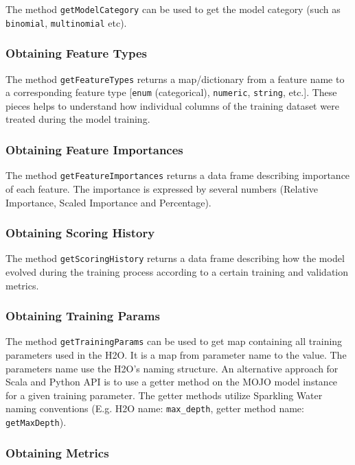 The method \texttt{getModelCategory} can be used to get the model category (such as \texttt{binomial}, \texttt{multinomial} etc).

\subsubsection{Obtaining Feature Types}

The method \texttt{getFeatureTypes} returns a map/dictionary from a feature name to a corresponding feature type
[\texttt{enum} (categorical), \texttt{numeric}, \texttt{string}, etc.]. These pieces helps to understand how individual
columns of the training dataset were treated during the model training.

\subsubsection{Obtaining Feature Importances}

The method \texttt{getFeatureImportances} returns a data frame describing importance of each feature. The importance is expressed
by several numbers (Relative Importance, Scaled Importance and Percentage).

\subsubsection{Obtaining Scoring History}

The method \texttt{getScoringHistory} returns a data frame describing how the model evolved during the training process
according to a certain training and validation metrics.

\subsubsection{Obtaining Training Params}

The method \texttt{getTrainingParams} can be used to get map containing all training parameters used in the H2O. It is a map
from parameter name to the value. The parameters name use the H2O's naming structure. An alternative approach for Scala and
Python API is to use a getter method on the MOJO model instance for a given training parameter. The getter methods utilize
Sparkling Water naming conventions (E.g. H2O name: \texttt{max\_depth}, getter method name: \texttt{getMaxDepth}).


\subsubsection{Obtaining Metrics}


